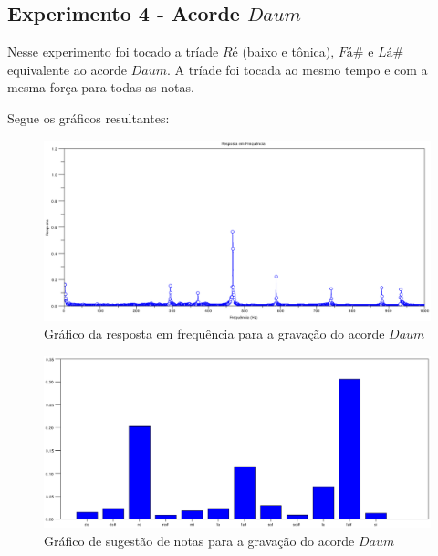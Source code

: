 \subsection{Experimento 4 - Acorde $Daum$}
\label{sec:experimento4}

Nesse experimento foi tocado a tríade $Ré$ (baixo e tônica), $Fá\#$ e $Lá\#$ equivalente ao acorde $Daum$. A tríade foi tocada ao mesmo tempo e com a mesma força para todas as notas.

Segue os gráficos resultantes:

\begin{figure}[h]
	\centering
		\includegraphics[keepaspectratio=true,scale=0.49]{figuras/Dm/fft_Daum.eps}
	\caption{Gráfico da resposta em frequência para a gravação do acorde $Daum$}
  \label{fig:espectro_Daum}
\end{figure}

\begin{figure}[h]
	\centering
		\includegraphics[keepaspectratio=true,scale=0.49]{figuras/Dm/notas_Daum.eps}
	\caption{Gráfico de sugestão de notas para a gravação do acorde $Daum$}
  \label{fig:notas_Daum}
\end{figure}

